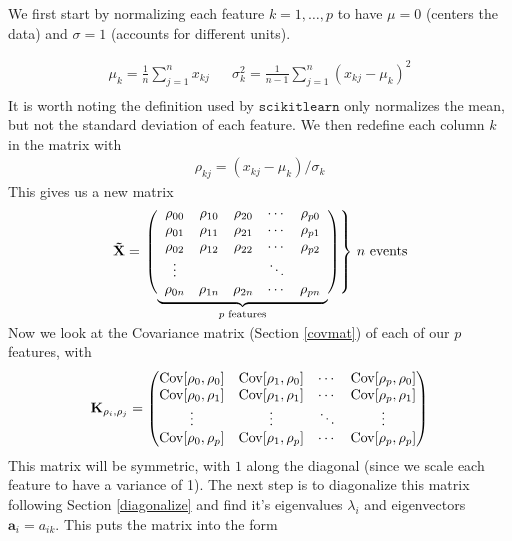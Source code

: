 We first start by normalizing each feature $k=1,\dots,p$ to have $\mu=0$ (centers the data) and $\sigma=1$ (accounts for different units).

\begin{align}
\mu_k = \frac{1}{n}\sum_{j=1}^n x_{kj} && \sigma_k^2 = \frac{1}{n-1}\sum_{j=1}^n (x_{kj}-\mu_k)^2 \\
\end{align}
It is worth noting the definition used by $\texttt{scikitlearn}$ only normalizes the mean, but not the standard deviation of each feature. We then redefine each column $k$ in the matrix with
\begin{align}
	\rho_{kj} = (x_{kj} - \mu_k)/\sigma_k
\end{align}
This gives us a new matrix
$$\mathbf{\tilde{X}} =  \left.\left( 
                  \vphantom{\begin{array}{c}1\\1\\1\\1\\1\end{array}}
                  \smash{\underbrace{
                      \begin{array}{ccccc}
                             \rho_{00}&\rho_{10}&\rho_{20}&\cdots &\rho_{p0}\\
                             \rho_{01}&\rho_{11}&\rho_{21}&\cdots &\rho_{p1}\\
                             \rho_{02}&\rho_{12}&\rho_{22}&\cdots &\rho_{p2}\\
                             \vdots&&&\ddots&\\
                             \rho_{0n}&\rho_{1n}&\rho_{2n}&\cdots &\rho_{pn}
                      \end{array}
                      }_{p\text{ features}}}
              \right)\right\}
              \,n\text{ events}
$$\\

Now we look at the Covariance matrix (Section \ref{covmat}) of each of our $p$ features, with
\begin{align}
\textbf{K}_{\rho_i,\rho_j} = \begin{pmatrix} 
                             \mathrm{Cov}[\rho_0,\rho_0]&\mathrm{Cov}[\rho_1,\rho_0]&\cdots &\mathrm{Cov}[\rho_p,\rho_0]\\
                             \mathrm{Cov}[\rho_0,\rho_1]&\mathrm{Cov}[\rho_1,\rho_1]&\cdots &\mathrm{Cov}[\rho_p,\rho_1]\\
                             \vdots&\vdots&\ddots&\vdots\\
                             \mathrm{Cov}[\rho_0,\rho_p]&\mathrm{Cov}[\rho_1,\rho_p]&\cdots &\mathrm{Cov}[\rho_p,\rho_p] \end{pmatrix}
\end{align}
This matrix will be symmetric, with $1$ along the diagonal (since we scale each feature to have a variance of 1). The next step is to diagonalize this matrix following Section \ref{diagonalize} and find it's eigenvalues $\lambda_i$ and eigenvectors $\textbf{a}_i = a_{ik}$. This puts the matrix into the form

